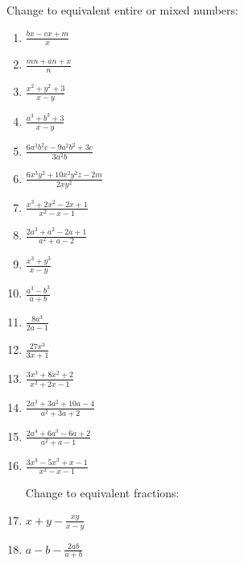 \documentclass{book}
\begin{document}
Change to equivalent entire or mixed numbers:
\begin{enumerate}
\item $ \displaystyle \frac{bx - cx + m}{x}$

\item $ \displaystyle \frac{mn + an + x}{n}$

\item $\displaystyle  \frac{x^2 + y^2 + 3}{x - y}$

\item $\displaystyle  \frac{a^3 + b^3 + 3}{x - y}$

\item $\displaystyle \frac{6 a^3 b^2 c - 9 a^2 b^2 + 3 c}{3 a^2
b}$

\item $\displaystyle \frac{6 x^3 y^2 + 10 x^2 y^2 z - 2 m}{2 x
y^2}$

\item $\displaystyle \frac{x^3 + 2 x^2 - 2 x + 1}{x^2 - x - 1}$

\item $\displaystyle \frac{2 a^3 + a^2 - 2a + 1}{a^2 + a - 2}$

\item $\displaystyle \frac{x^3 + y^3}{x - y}$

\item $\displaystyle \frac{a^3 - b^3}{a + b}$

\item $\displaystyle \frac{8a^3}{2a - 1}$

\item $\displaystyle \frac{27 x^3}{3x + 1}$

\item $\displaystyle \frac{3x^3 + 8x^2 + 2}{x^2 + 2x - 1}$

\item $\displaystyle \frac{2a^3 + 3a^2 + 10a - 4}{a^2 + 3a + 2}$

\item $\displaystyle \frac{2a^4 + 6a^3 - 6a + 2}{a^2 +a - 1}$

\item $\displaystyle \frac{3x^4 - 5x^3 + x - 1}{x^2 - x - 1}$

Change to equivalent fractions:

\item $\displaystyle x + y - \frac{xy}{x - y}$

\item $\displaystyle a - b - \frac{2 ab}{a + b}$


\end{enumerate}
\end{document}
